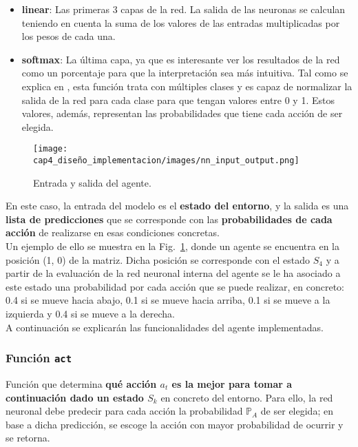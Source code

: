 \begin{itemize}
    \item \textbf{linear}: Las primeras 3 capas de la red. La salida de las neuronas se calculan teniendo en cuenta la suma de los valores de las entradas multiplicadas por los pesos de cada una. 
    \item \textbf{softmax}: La última capa, ya que es interesante ver los resultados de la red como un porcentaje para que la interpretación sea más intuitiva. Tal como se explica en \cite{activationFunctionTypes}, esta función trata con múltiples clases y es capaz de normalizar la salida de la red para cada clase para que tengan valores entre 0 y 1. Estos valores, además, representan las probabilidades que tiene cada acción de ser elegida.
\end{itemize}

\begin{figure}
    \centering
    \texttt{[image: cap4\_diseño\_implementacion/images/nn\_input\_output.png]}
    \caption{Entrada y salida del agente.}
    \label{fig:nn_input_output}
\end{figure}

En este caso, la entrada del modelo es el \textbf{estado del entorno}, y la salida es una \textbf{lista de predicciones} que se corresponde con las \textbf{probabilidades de cada acción} de realizarse en esas condiciones concretas. \\

Un ejemplo de ello se muestra en la Fig.~\ref{fig:nn_input_output}, donde un agente se encuentra en la posición (1, 0) de la matriz. Dicha posición se corresponde con el estado $S_4$ y a partir de la evaluación de la red neuronal interna del agente se le ha asociado a este estado una probabilidad por cada acción que se puede realizar, en concreto: 0.4 si se mueve hacia abajo, 0.1 si se mueve hacia arriba, 0.1 si se mueve a la izquierda y 0.4 si se mueve a la derecha. \\
   
A continuación se explicarán las funcionalidades del agente implementadas. 

\subsubsection{Función \texttt{act}}

Función que determina \textbf{qué acción $a_t$ es la mejor para tomar a continuación dado un estado $S_k$} en concreto del entorno. Para ello, la red neuronal debe predecir para cada acción la probabilidad $\mathbb{P}_{A}$ de ser elegida; en base a dicha predicción, se escoge la acción con mayor probabilidad de ocurrir y se retorna. \\

